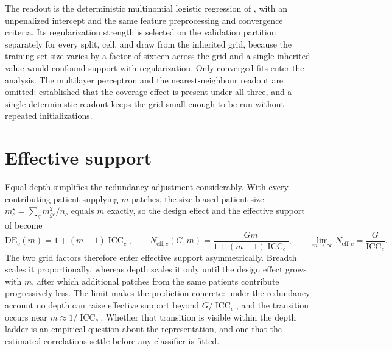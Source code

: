 \documentclass[11pt]{article}
\newcommand{\ICC}{\operatorname{ICC}}
\newcommand{\DE}{\mathrm{DE}}
\begin{document}
The readout is the deterministic multinomial logistic regression of \citet{queisler2026patientShortage}, with an unpenalized intercept and the same feature preprocessing and convergence criteria. Its regularization strength is selected on the validation partition separately for every split, cell, and draw from the inherited grid, because the training-set size varies by a factor of sixteen across the grid and a single inherited value would confound support with regularization. Only converged fits enter the analysis. The multilayer perceptron and the nearest-neighbour readout are omitted: \citet{queisler2026patientShortage} established that the coverage effect is present under all three, and a single deterministic readout keeps the grid small enough to be run without repeated initializations.

\section{Effective support}
\label{sec:effective-support}
Equal depth simplifies the redundancy adjustment considerably. With every contributing patient supplying $m$ patches, the size-biased patient size $m^{\star}_c=\sum_g m_{gc}^2/n_c$ equals $m$ exactly, so the design effect and the effective support of \citet{queisler2026imbalanceMethods} become
\begin{equation}
  \DE_c(m)=1+(m-1)\ICC_c,
  \qquad
  N_{\mathrm{eff},c}(G,m)=\frac{Gm}{1+(m-1)\ICC_c},
  \qquad
  \lim_{m\to\infty}N_{\mathrm{eff},c}=\frac{G}{\ICC_c}.
  \label{eq:neff-equal}
\end{equation}
\noindent The two grid factors therefore enter effective support asymmetrically. Breadth scales it proportionally, whereas depth scales it only until the design effect grows with $m$, after which additional patches from the same patients contribute progressively less. The limit makes the prediction concrete: under the redundancy account no depth can raise effective support beyond $G/\ICC_c$, and the transition occurs near $m\approx 1/\ICC_c$. Whether that transition is visible within the depth ladder is an empirical question about the representation, and one that the estimated correlations settle before any classifier is fitted.
\end{document}
